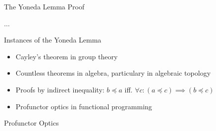 \documentclass[aspectratio=169]{beamer} %
\begin{document}
{\begin{frame}{The Yoneda Lemma}
Proof
\end{frame}
\begin{frame}
 $\hdots$
\end{frame}
\begin{frame}{Instances of the Yoneda Lemma}
\begin{itemize}
 \item Cayley's theorem in group theory
 \item Countless theorems in algebra, particulary in algebraic topology
 \item Proofs by indirect inequality: $b \preceq a$ iff. $\forall c : (a \preceq c) \implies (b \preceq c)$
 \item Profunctor optics in functional programming
\end{itemize}

\end{frame}
\begin{frame}{Profunctor Optics}
\end{frame}

}
\end{document}

